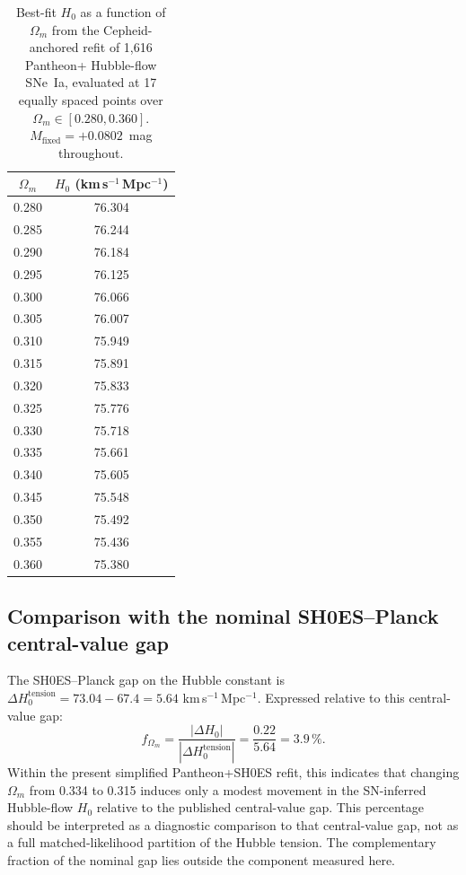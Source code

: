 \documentclass[fleqn,usenatbib,useAMS]{mnras}
\begin{document}
\begin{table}
  \centering
  \caption{Best-fit $H_0$ as a function of $\Omega_m$ from the
    Cepheid-anchored refit of 1{,}616 Pantheon+ Hubble-flow SNe~Ia,
    evaluated at 17 equally spaced points over $\Omega_m \in [0.280,0.360]$.
    $M_\mathrm{fixed} = +0.0802$~mag throughout.}
  \label{tab:h0scan}
  \begin{tabular}{cc}
    \hline
    $\Omega_m$ & $H_0$ (km\,s$^{-1}$\,Mpc$^{-1}$) \\
    \hline
    0.280 & 76.304 \\
    0.285 & 76.244 \\
    0.290 & 76.184 \\
    0.295 & 76.125 \\
    0.300 & 76.066 \\
    0.305 & 76.007 \\
    0.310 & 75.949 \\
    0.315 & 75.891 \\
    0.320 & 75.833 \\
    0.325 & 75.776 \\
    0.330 & 75.718 \\
    0.335 & 75.661 \\
    0.340 & 75.605 \\
    0.345 & 75.548 \\
    0.350 & 75.492 \\
    0.355 & 75.436 \\
    0.360 & 75.380 \\
    \hline
  \end{tabular}
\end{table}

\subsection{Comparison with the nominal SH0ES--Planck central-value gap}

The SH0ES--Planck gap on the Hubble constant is
$\Delta H_0^\mathrm{tension} = 73.04 - 67.4 = 5.64$
km\,s$^{-1}$\,Mpc$^{-1}$.
Expressed relative to this central-value gap:
\begin{equation}
  f_{\Omega_m} =
    \frac{|\Delta H_0|}{|\Delta H_0^\mathrm{tension}|}
    = \frac{0.22}{5.64} = 3.9\,\%.
  \label{eq:fraction}
\end{equation}
Within the present simplified Pantheon+SH0ES refit, this indicates
that changing $\Omega_m$ from 0.334 to 0.315 induces only a modest
movement in the SN-inferred Hubble-flow $H_0$ relative to the
published central-value gap.
This percentage should be interpreted as a diagnostic comparison to
that central-value gap, not as a full matched-likelihood partition
of the Hubble tension.
The complementary fraction of the nominal gap lies outside
the component measured here.
\end{document}
